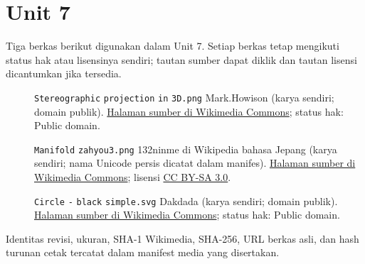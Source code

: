 \section*{Unit 7}
Tiga berkas berikut digunakan dalam Unit 7. Setiap berkas tetap mengikuti status hak atau lisensinya sendiri; tautan sumber dapat diklik dan tautan lisensi dicantumkan jika tersedia.
\begin{description}
\item[]\texttt{Stereographic} \texttt{projection} \texttt{in} \texttt{3D.png}
Mark.Howison (karya sendiri; domain publik).
\href{https://commons.wikimedia.org/wiki/File:Stereographic_projection_in_3D.png}{Halaman sumber di Wikimedia Commons}; status hak: Public domain.
\item[]\texttt{Manifold} \texttt{zahyou3.png}
132ninme di Wikipedia bahasa Jepang (karya sendiri; nama Unicode persis dicatat dalam manifes).
\href{https://commons.wikimedia.org/wiki/File:Manifold_zahyou3.png}{Halaman sumber di Wikimedia Commons}; lisensi \href{https://creativecommons.org/licenses/by-sa/3.0/}{CC BY-SA 3.0}.
\item[]\texttt{Circle} \texttt{-} \texttt{black} \texttt{simple.svg}
Dakdada (karya sendiri; domain publik).
\href{https://commons.wikimedia.org/wiki/File:Circle_-_black_simple.svg}{Halaman sumber di Wikimedia Commons}; status hak: Public domain.
\end{description}
Identitas revisi, ukuran, SHA-1 Wikimedia, SHA-256, URL berkas asli, dan hash turunan cetak tercatat dalam manifest media yang disertakan.
